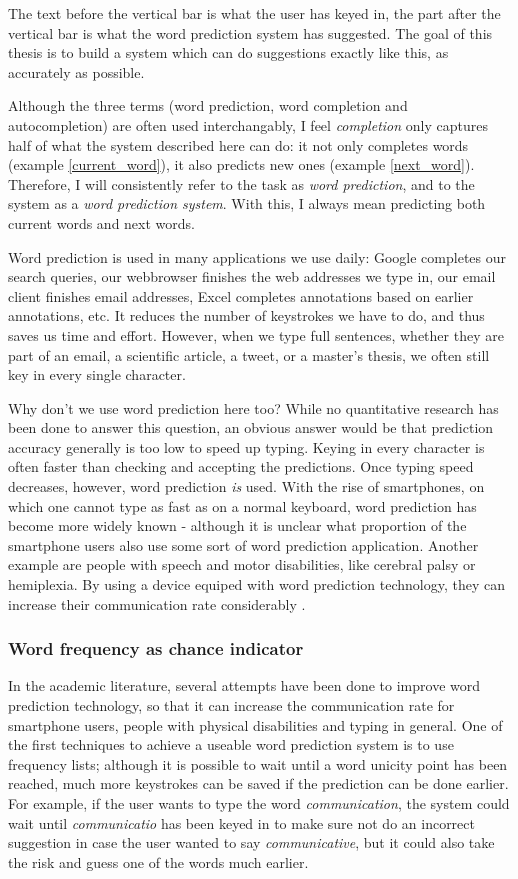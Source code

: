 \documentclass[12pt]{article}
\begin{document}
The text before the vertical bar is what the user has keyed in, the part after the vertical bar is what the word prediction system has suggested. The goal of this thesis is to build a system which can do suggestions exactly like this, as accurately as possible. 

Although the three terms (word prediction, word completion and autocompletion) are often used interchangably, I feel \emph{completion} only captures half of what the system described here can do: it not only completes words (example \ref{current_word}), it also predicts new ones (example \ref{next_word}). Therefore, I will consistently refer to the task as \emph{word prediction}, and to the system as a \emph{word prediction system}. With this, I always mean predicting both current words and next words.

Word prediction is used in many applications we use daily: Google completes our search queries, our webbrowser finishes the web addresses we type in, our email client finishes email addresses, Excel completes annotations based on earlier annotations, etc. It reduces the number of keystrokes we have to do, and thus saves us time and effort. However, when we type full sentences, whether they are part of an email, a scientific article, a tweet, or a master's thesis, we often still key in every single character. 

Why don't we use word prediction here too? While no quantitative research has been done to answer this question, an obvious answer would be that prediction accuracy generally is too low to speed up typing. Keying in every character is often faster than checking and accepting the predictions. Once typing speed decreases, however, word prediction \emph{is} used. With the rise of smartphones,  on which one  cannot type as fast as on a normal keyboard, word prediction has become more widely known - although it is unclear what proportion of the smartphone users also use some sort of word prediction application. Another example are  people with speech and motor disabilities, like cerebral palsy or hemiplexia. By using a device equiped with word prediction technology, they can increase their communication rate considerably \cite{Garay-Vitoria+06}.

\subsubsection{Word frequency as chance indicator}

In the academic literature, several attempts have been done to improve word prediction technology, so that it can increase the communication rate for smartphone users, people with physical disabilities and typing in general. One of the first techniques to achieve a useable word prediction system is to use frequency lists; although it is possible to wait until a word unicity point has been reached, much more keystrokes can be saved if the prediction can be done earlier. For example, if the user wants to type the word \emph{communication}, the system could wait until \emph{communicatio} has been keyed in to make sure not do an incorrect suggestion in case the user wanted to say \emph{communicative}, but it could also take the risk and guess one of the words much earlier. 
\end{document}
